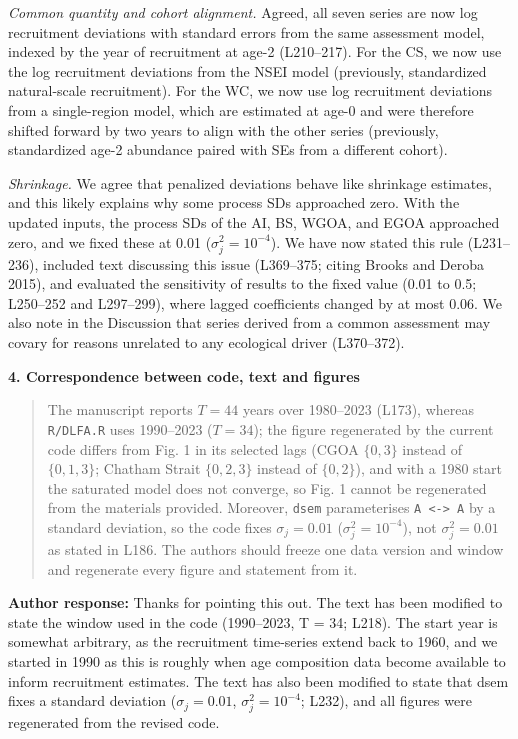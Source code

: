 \documentclass[11pt]{article}
\begin{document}
\emph{Common quantity and cohort alignment.} Agreed, all seven series
are now log recruitment deviations with standard errors from the same
assessment model, indexed by the year of recruitment at age-2
(L210--217). For the CS, we now use the log recruitment deviations from
the NSEI model (previously, standardized natural-scale recruitment). For
the WC, we now use log recruitment deviations from a single-region
model, which are estimated at age-0 and were therefore shifted forward
by two years to align with the other series (previously, standardized
age-2 abundance paired with SEs from a different cohort).

\emph{Shrinkage.} We agree that penalized deviations behave like
shrinkage estimates, and this likely explains why some process SDs
approached zero. With the updated inputs, the process SDs of the AI, BS,
WGOA, and EGOA approached zero, and we fixed these at 0.01
(\(\sigma_j^2 = 10^{-4}\)). We have now stated this rule (L231--236),
included text discussing this issue (L369--375; citing Brooks and Deroba
2015), and evaluated the sensitivity of results to the fixed value (0.01
to 0.5; L250--252 and L297--299), where lagged coefficients changed by
at most 0.06. We also note in the Discussion that series derived from a
common assessment may covary for reasons unrelated to any ecological
driver (L370--372).

\textbf{4. Correspondence between code, text and figures}

\begin{quote}
The manuscript reports \(T = 44\) years over 1980--2023 (L173), whereas
\texttt{R/DLFA.R} uses 1990--2023 (\(T = 34\)); the figure regenerated
by the current code differs from Fig. 1 in its selected lags (CGOA
\(\{0,3\}\) instead of \(\{0,1,3\}\); Chatham Strait \(\{0,2,3\}\)
instead of \(\{0,2\}\)), and with a 1980 start the saturated model does
not converge, so Fig. 1 cannot be regenerated from the materials
provided. Moreover, \texttt{dsem} parameterises
\texttt{A\ \textless{}-\textgreater{}\ A} by a standard deviation, so
the code fixes \(\sigma_j = 0.01\) (\(\sigma_j^2 = 10^{-4}\)), not
\(\sigma_j^2 = 0.01\) as stated in L186. The authors should freeze one
data version and window and regenerate every figure and statement from
it.
\end{quote}

\textbf{Author response:} Thanks for pointing this out. The text has
been modified to state the window used in the code (1990--2023, T = 34;
L218). The start year is somewhat arbitrary, as the recruitment
time-series extend back to 1960, and we started in 1990 as this is
roughly when age composition data become available to inform recruitment
estimates. The text has also been modified to state that dsem fixes a
standard deviation (\(\sigma_j = 0.01\), \(\sigma_j^2 = 10^{-4}\);
L232), and all figures were regenerated from the revised code.
\end{document}
